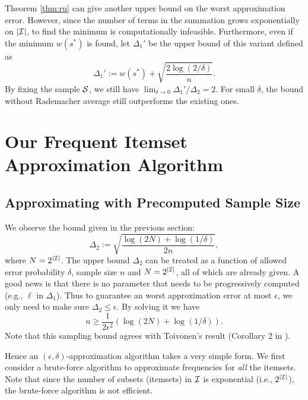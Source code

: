 \documentclass{article}
\begin{document}
Theorem \ref{thm:ru} can give another upper bound on the worst approximation error. However, since the number of terms in the summation grows exponentially on $|\mathcal{I}|$, to find the minimum is computationally infeasible. Furthermore, even if the minimum $w(s^*)$ is found, let $\Delta_1'$ be the upper bound of this variant defined as 
$$\Delta_1' := w(s^*) + \sqrt{\frac{2\log(2/\delta)}{n}}.$$
By fixing the sample $\mathcal{S}$, we still have $\lim_{\delta\to 0}\Delta_1'/\Delta_2 = 2$. For small $\delta$, the bound without Rademacher average still outperforms the existing ones.

\section{Our Frequent Itemset Approximation Algorithm}
\label{sec:algs}
\subsection{Approximating with Precomputed Sample Size}
\label{sec:nonprg}
We observe the bound given in the previous section:
$$\Delta_2 := \sqrt{\frac{\log(2N) + \log(1/\delta)}{2n}},$$
where $N = 2^{|\mathcal{I}|}$.
The upper bound $\Delta_2$ can be treated as a function of allowed error probability $\delta$, sample size $n$ and $N = 2^{|\mathcal{I}|}$, all of which are already given. A good news is that there is no parameter that needs to be progressively computed (e.g., $\ell$ in $\Delta_1$). Thus to guarantee an worst approximation error at most $\epsilon$, we only need to make sure $\Delta_2 \leq \epsilon$. By solving it we have
$$n \geq \frac{1}{2\epsilon^2}(\log (2N) + \log (1/\delta)).$$
Note that this sampling bound agrees with Toivonen's result (Corollary 2 in \cite{Toi96}).

Hence an $(\epsilon,\delta)$-approximation algorithm takes a very simple form. We first consider a brute-force algorithm to approximate frequencies for \emph{all} the itemsets. Note that since the number of subsets (itemsets) in $\mathcal{I}$ is exponential (i.e., $2^{|\mathcal{I}|}$), the brute-force algorithm is not efficient.
\end{document}
